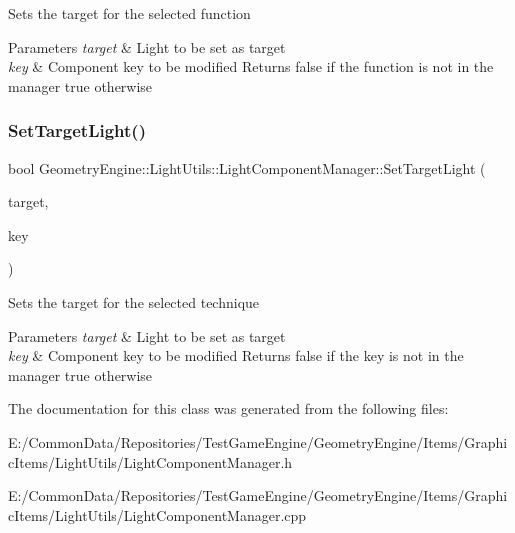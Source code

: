 Sets the target for the selected function 
\begin{DoxyParams}{Parameters}
{\em target} & Light to be set as target \\
\hline
{\em key} & Component key to be modified Returns false if the function is not in the manager true otherwise \\
\hline
\end{DoxyParams}
\mbox{\label{class_geometry_engine_1_1_light_utils_1_1_light_component_manager_a617a2cf91b3e0280a2f88cb91ce0fb04}} 
\subsubsection{\texorpdfstring{SetTargetLight()}{SetTargetLight()}\hspace{0.1cm}{\footnotesize\ttfamily [3/3]}}
{\footnotesize\ttfamily bool Geometry\+Engine\+::\+Light\+Utils\+::\+Light\+Component\+Manager\+::\+Set\+Target\+Light (\begin{DoxyParamCaption}\item[{\mbox{\hyperlink{class_geometry_engine_1_1_geometry_world_item_1_1_geometry_light_1_1_light}{Geometry\+World\+Item\+::\+Geometry\+Light\+::\+Light}} $\ast$}]{target,  }\item[{\mbox{\hyperlink{namespace_geometry_engine_1_1_light_utils_ac3078de660742daceaa06bd9bc61d24a}{Light\+Render}}}]{key }\end{DoxyParamCaption})}

Sets the target for the selected technique 
\begin{DoxyParams}{Parameters}
{\em target} & Light to be set as target \\
\hline
{\em key} & Component key to be modified Returns false if the key is not in the manager true otherwise \\
\hline
\end{DoxyParams}


The documentation for this class was generated from the following files\+:\begin{DoxyCompactItemize}
\item 
E\+:/\+Common\+Data/\+Repositories/\+Test\+Game\+Engine/\+Geometry\+Engine/\+Items/\+Graphic\+Items/\+Light\+Utils/Light\+Component\+Manager.\+h\item 
E\+:/\+Common\+Data/\+Repositories/\+Test\+Game\+Engine/\+Geometry\+Engine/\+Items/\+Graphic\+Items/\+Light\+Utils/Light\+Component\+Manager.\+cpp\end{DoxyCompactItemize}
